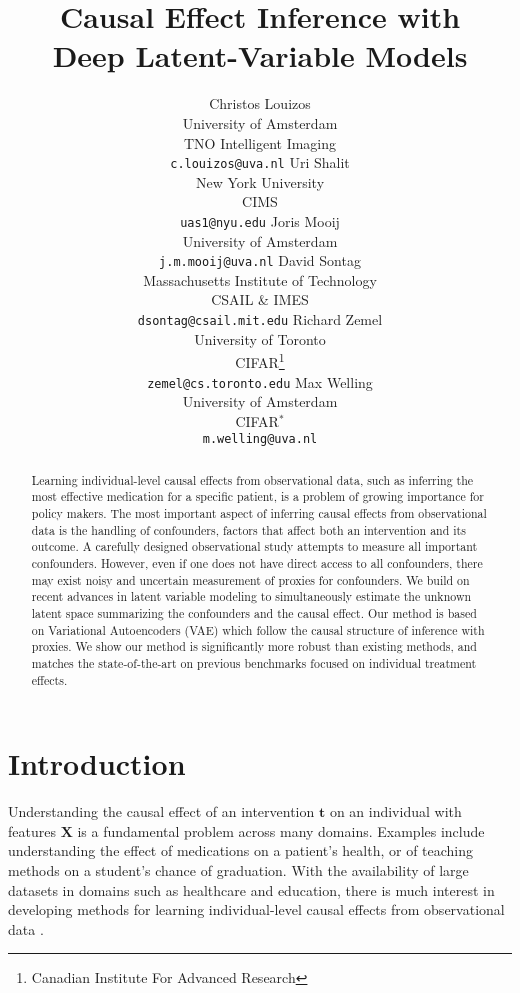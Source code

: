 \documentclass{article}
\title{Causal Effect Inference with \\ Deep Latent-Variable Models}
\author{ Christos Louizos \\
University of Amsterdam\\
TNO Intelligent Imaging\\
\texttt{c.louizos@uva.nl}
\And
Uri Shalit  \\
New York University\\
CIMS\\
\texttt{uas1@nyu.edu}
\And
Joris Mooij   \\
University of Amsterdam\\
\texttt{j.m.mooij@uva.nl}
\AND 
David Sontag\\
Massachusetts Institute of Technology\\
CSAIL \& IMES\\
\texttt{dsontag@csail.mit.edu}
\And 
Richard Zemel\\
University of Toronto\\
CIFAR\thanks{Canadian Institute For Advanced Research}\\
\texttt{zemel@cs.toronto.edu}
\And 
Max Welling\\
University of Amsterdam\\
CIFAR$^*$\\
\texttt{m.welling@uva.nl}
}
\def\*#1{\mathbf{#1}}
\begin{document}
\maketitle

\begin{abstract}
Learning individual-level causal effects from observational data, such as inferring the most effective medication for a specific patient, is a problem of growing importance for policy makers. The most important aspect of inferring causal effects from observational data is the handling of confounders, factors that affect both an intervention and its outcome. A carefully designed observational study attempts to measure all important confounders. However, even if one does not have direct access to all confounders, there may exist noisy and uncertain measurement of proxies for confounders.
We build on recent advances in latent variable modeling to simultaneously estimate the unknown latent space summarizing the confounders and the causal effect. 
Our method is based on Variational Autoencoders (VAE) which follow the causal structure of inference with proxies. We show our method is significantly more robust than existing methods, and matches the state-of-the-art on previous benchmarks focused on individual treatment effects. 
\end{abstract}

\section{Introduction}
Understanding the causal effect of an intervention $\*t$ on an individual with features $\*X$ is a fundamental problem across many domains. Examples include understanding the effect of medications on a patient's health, or of teaching methods on a student's chance of graduation. With the availability of large datasets in domains such as healthcare and education, there is much interest in developing methods for learning individual-level causal effects from observational data \citep{pearl2015detecting,wager2015estimation,johansson2016learning,peysakhovich2016combining}. 
\end{document}
